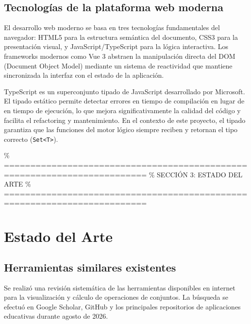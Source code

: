 \documentclass[11pt,a4paper]{article}
\begin{document}
\subsection{Tecnologías de la plataforma web moderna}
El desarrollo web moderno se basa en tres tecnologías fundamentales del navegador: HTML5 para la estructura semántica del documento, CSS3 para la presentación visual, y JavaScript/TypeScript para la lógica interactiva. Los frameworks modernos como Vue 3 abstraen la manipulación directa del DOM (Document Object Model) mediante un sistema de reactividad que mantiene sincronizada la interfaz con el estado de la aplicación.

TypeScript es un superconjunto tipado de JavaScript desarrollado por Microsoft. El tipado estático permite detectar errores en tiempo de compilación en lugar de en tiempo de ejecución, lo que mejora significativamente la calidad del código y facilita el refactoring y mantenimiento. En el contexto de este proyecto, el tipado garantiza que las funciones del motor lógico siempre reciben y retornan el tipo correcto (\texttt{Set<T>}).

\newpage

\% =========================================================================
\% SECCIÓN 3: ESTADO DEL ARTE
\% =========================================================================
\section{Estado del Arte}

\subsection{Herramientas similares existentes}
Se realizó una revisión sistemática de las herramientas disponibles en internet para la visualización y cálculo de operaciones de conjuntos. La búsqueda se efectuó en Google Scholar, GitHub y los principales repositorios de aplicaciones educativas durante agosto de 2026.
\end{document}
